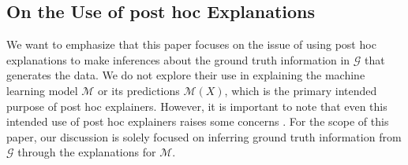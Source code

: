 \documentclass[mnsc,blindrev]{informs3}
\newcommand{\mG}{\mathcal{G}}
\newcommand{\mM}{\mathcal{M}}
\begin{document}

    
    
    \subsection{On the Use of post hoc Explanations}
  We want to emphasize that this paper focuses on the issue of using post hoc explanations to make inferences about the ground truth information in $\mG$ that generates the data. We do not explore their use in explaining the machine learning model $\mM$ or its predictions $\mathcal{M}(X)$, which is the primary intended purpose of post hoc explainers. However, it is important to note that even this intended use of post hoc explainers raises some concerns \citep{garreau2020looking,alvarez18robustness,kumar20shap,jacovi2023diagnosing}. For the scope of this paper, our discussion is solely focused on inferring ground truth information from $\mathcal{G}$ through the explanations for $\mathcal{M}$.
\end{document}
